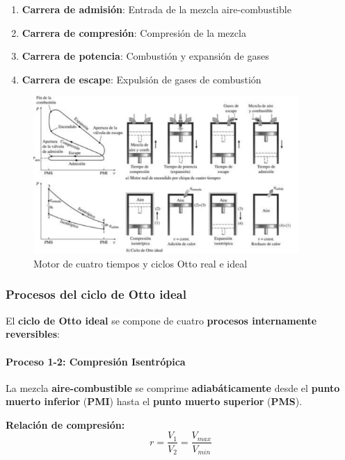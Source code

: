 \documentclass{article}
\begin{document}
    \begin{enumerate}
        \item \textbf{Carrera de admisión}: Entrada de la mezcla aire-combustible
        \item \textbf{Carrera de compresión}: Compresión de la mezcla
        \item \textbf{Carrera de potencia}: Combustión y expansión de gases
        \item \textbf{Carrera de escape}: Expulsión de gases de combustión
    \end{enumerate}

    \begin{figure}[H]
        \centering
        \includegraphics[width=0.9\textwidth]{Pasted_image_20250803092813.png}
        \caption{Motor de cuatro tiempos y ciclos Otto real e ideal}
        \label{fig:motor_otto}
    \end{figure}

    \subsubsection{Procesos del ciclo de Otto ideal}

    El \textbf{ciclo de Otto ideal} se compone de cuatro \textbf{procesos internamente reversibles}:

    \paragraph{Proceso 1-2: Compresión Isentrópica}
    La mezcla \textbf{aire-combustible} se comprime \textbf{adiabáticamente} desde el \textbf{punto muerto inferior} (\textbf{PMI}) hasta el \textbf{punto muerto superior} (\textbf{PMS}).

    \textbf{Relación de compresión:}
    $$
        r = \frac{V_1}{V_2} = \frac{V_{max}}{V_{min}}
    $$
\end{document}
